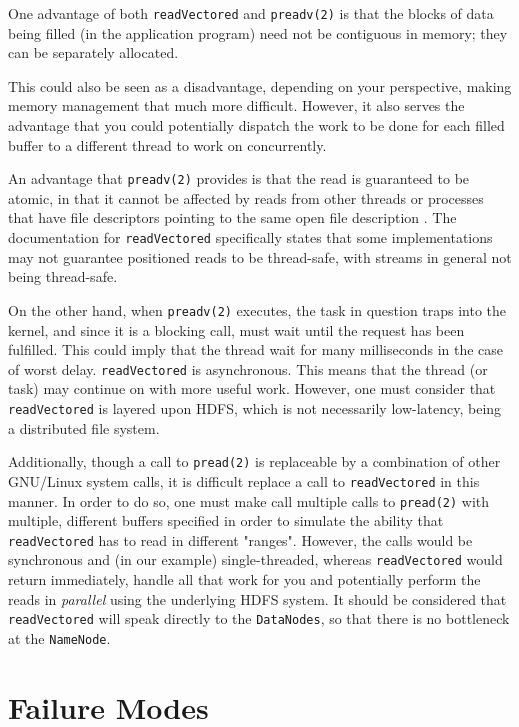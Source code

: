 \documentclass[letterpaper,twocolumn]{article}
\begin{document}
One advantage of both \texttt{readVectored} and \texttt{preadv(2)} is that the blocks of data being filled (in the application program) need not be contiguous in memory; they can be separately allocated. 

This could also be seen as a disadvantage, depending on your perspective, making memory management that much more difficult. However, it also serves the advantage that you could potentially dispatch the work to be done for each filled buffer to a different thread to work on concurrently.

An advantage that \texttt{preadv(2)} provides is that the read is guaranteed to be atomic, in that it cannot be affected by reads from other threads or processes that have file descriptors pointing to the same open file description \cite{7}. The documentation for \texttt{readVectored} \cite{4} specifically states that some implementations may not guarantee positioned reads to be thread-safe, with streams in general not being thread-safe.

On the other hand, when \texttt{preadv(2)} executes, the task in question traps into the kernel, and since it is a blocking call, must wait until the request has been fulfilled. This could imply that the thread wait for many milliseconds in the case of worst delay. 
\texttt{readVectored} is asynchronous. This means that the thread (or task) may continue on with more useful work. However, one must consider that \texttt{readVectored} is layered upon HDFS, which is not necessarily low-latency, being a distributed file system.

Additionally, though a call to \texttt{pread(2)} is replaceable by a combination of other GNU/Linux system calls, it is difficult replace a call to \texttt{readVectored} in this manner. In order to do so, one must make call multiple calls to \texttt{pread(2)} with multiple, different buffers specified in order to simulate the ability that \texttt{readVectored} has to read in different "ranges". However, the calls would be synchronous and (in our example) single-threaded, whereas \texttt{readVectored} would return immediately, handle all that work for you and potentially perform the reads in \emph{parallel} using the underlying HDFS system. It should be considered that \texttt{readVectored} will speak directly to the \texttt{DataNodes}, so that there is no bottleneck at the \texttt{NameNode}.

\section{Failure Modes}
\end{document}

